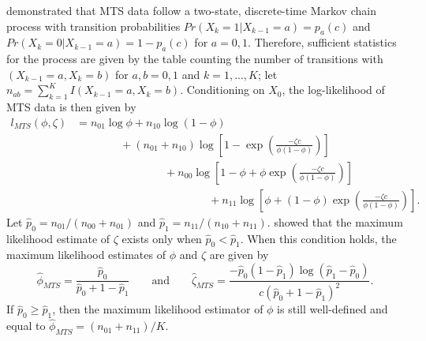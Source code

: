 \documentclass[man, noextraspace, floatsintext]{apa6}\usepackage[]{graphicx}\usepackage[]{color}
\begin{document}
\citet{Brown1977estimation} demonstrated that MTS data follow a two-state, discrete-time Markov chain process with transition probabilities $Pr(X_k = 1 | X_{k-1} = a) = p_a(c)$ and $Pr(X_k = 0 | X_{k-1} = a) = 1 - p_a(c)$ for $a = 0,1$. 
Therefore, sufficient statistics for the process are given by the table counting the number of transitions with $(X_{k-1} = a, X_k = b)$ for $a,b = 0,1$ and $k = 1,...,K$; let $n_{ab} = \sum_{k=1}^K I(X_{k-1} = a, X_k = b)$. 
Conditioning on $X_0$, the log-likelihood of MTS data is then given by \begin{equation}
\begin{aligned}
\label{eq:MTS_loglik}
l_{MTS}(\phi, \zeta) &= n_{01} \log \phi + n_{10} \log\left(1 - \phi\right) \\
& \qquad \qquad + \left(n_{01} + n_{10}\right) \log \left[1 - \exp\left(\frac{-\zeta c}{\phi (1 - \phi)}\right)\right] \\
& \qquad \qquad \qquad \qquad + n_{00} \log\left[1 - \phi + \phi \exp\left(\frac{-\zeta c}{\phi (1 - \phi)}\right)\right]\\
& \qquad \qquad \qquad \qquad \qquad \qquad + n_{11}\log\left[\phi + \left(1 - \phi\right)\exp\left(\frac{-\zeta c}{\phi (1 - \phi)}\right)\right].
\end{aligned}
\end{equation}
Let $\hat{p}_0 = n_{01}/ \left(n_{00} + n_{01}\right)$ and $\hat{p}_1 = n_{11} / \left(n_{10} + n_{11}\right)$. \citet{Brown1977estimation} showed that the maximum likelihood estimate of $\zeta$ exists only when $\hat{p}_0 < \hat{p}_1$. 
When this condition holds, the maximum likelihood estimates of $\phi$ and $\zeta$ are given by 
\begin{equation}
\label{eq:MTS_mle}
\hat\phi_{MTS} = \frac{\hat{p}_0}{\hat{p}_0 + 1 - \hat{p}_1} \qquad \text{and} \qquad
\hat\zeta_{MTS} = \frac{-\hat{p}_0 \left(1 - \hat{p}_1\right) \log(\hat{p}_1 - \hat{p}_0)}{c \left(\hat{p}_0 + 1 - \hat{p}_1\right)^2}.
\end{equation}
If $\hat{p}_0 \geq \hat{p}_1$, then the maximum likelihood estimator of $\phi$ is still well-defined and equal to $\hat\phi_{MTS} = \left(n_{01} + n_{11}\right) / K$. 
\end{document}
